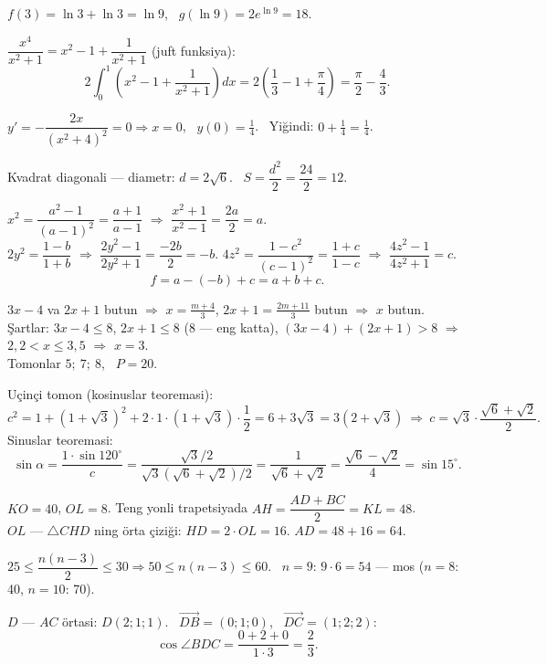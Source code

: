 $f(3)=\ln3+\ln3=\ln9$, \ $g(\ln9)=2e^{\ln9}=18$.

$\dfrac{x^4}{x^2+1}=x^2-1+\dfrac1{x^2+1}$ (juft funksiya):
\[2\int_0^1\left(x^2-1+\frac1{x^2+1}\right)dx=2\left(\frac13-1+\frac\pi4\right)=\frac\pi2-\frac43.\]

$y'=-\dfrac{2x}{(x^2+4)^2}=0\Rightarrow x=0$, \ $y(0)=\frac14$. \ Yiğindi: $0+\frac14=\frac14$.

Kvadrat diagonali — diametr: $d=2\sqrt6$. \ $S=\dfrac{d^2}2=\dfrac{24}2=12$.

$x^2=\dfrac{a^2-1}{(a-1)^2}=\dfrac{a+1}{a-1}$ $\Rightarrow$ $\dfrac{x^2+1}{x^2-1}=\dfrac{2a}2=a$.\\
$2y^2=\dfrac{1-b}{1+b}$ $\Rightarrow$ $\dfrac{2y^2-1}{2y^2+1}=\dfrac{-2b}2=-b$. \quad $4z^2=\dfrac{1-c^2}{(c-1)^2}=\dfrac{1+c}{1-c}$ $\Rightarrow$ $\dfrac{4z^2-1}{4z^2+1}=c$.
\[f=a-(-b)+c=a+b+c.\]

$3x-4$ va $2x+1$ butun $\Rightarrow$ $x=\frac{m+4}3$, $2x+1=\frac{2m+11}3$ butun $\Rightarrow$ $x$ butun.\\
Şartlar: $3x-4\le8$, $2x+1\le8$ ($8$ — eng katta), $(3x-4)+(2x+1)>8$ $\Rightarrow$ $2{,}2<x\le3{,}5$ $\Rightarrow$ $x=3$.\\
Tomonlar $5;\ 7;\ 8$, \ $P=20$.

Uçinçi tomon (kosinuslar teoremasi):
\[c^2=1+(1+\sqrt3)^2+2\cdot1\cdot(1+\sqrt3)\cdot\frac12=6+3\sqrt3=3(2+\sqrt3)\ \Rightarrow\ c=\sqrt3\cdot\frac{\sqrt6+\sqrt2}2.\]
Sinuslar teoremasi:
\[\sin\alpha=\frac{1\cdot\sin120^\circ}c=\frac{\sqrt3/2}{\sqrt3(\sqrt6+\sqrt2)/2}=\frac1{\sqrt6+\sqrt2}=\frac{\sqrt6-\sqrt2}4=\sin15^\circ.\]

$KO=40$, $OL=8$. Teng yonli trapetsiyada $AH=\dfrac{AD+BC}2=KL=48$.\\
$OL$ — $\triangle CHD$ ning örta çiziği: $HD=2\cdot OL=16$. \quad $AD=48+16=64$.

$25\le\dfrac{n(n-3)}2\le30\Rightarrow50\le n(n-3)\le60$. \ $n=9$: $9\cdot6=54$ — mos ($n=8$: 40, $n=10$: 70).

$D$ — $AC$ örtasi: $D(2;1;1)$. \ $\overrightarrow{DB}=(0;1;0)$, \ $\overrightarrow{DC}=(1;2;2)$:
\[\cos\angle BDC=\frac{0+2+0}{1\cdot3}=\frac23.\]

